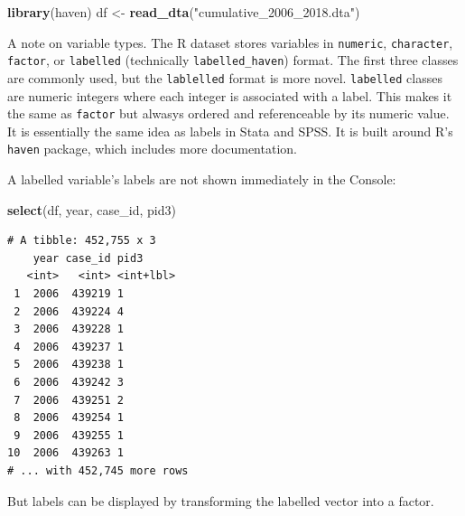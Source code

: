 \documentclass[10pt,article,oneside]{memoir}
\theoremstyle{definition}
\newenvironment{Shaded}{\begin{snugshade}}{\end{snugshade}}
\newcommand{\KeywordTok}[1]{\textcolor[rgb]{0.13,0.29,0.53}{\textbf{#1}}}
\newcommand{\DataTypeTok}[1]{\textcolor[rgb]{0.13,0.29,0.53}{#1}}
\newcommand{\StringTok}[1]{\textcolor[rgb]{0.31,0.60,0.02}{#1}}
\newcommand{\OperatorTok}[1]{\textcolor[rgb]{0.81,0.36,0.00}{\textbf{#1}}}
\newcommand{\NormalTok}[1]{#1}
\begin{document}
\begin{Shaded}
\begin{Highlighting}[]
\KeywordTok{library}\NormalTok{(haven)}
\NormalTok{df <-}\StringTok{ }\KeywordTok{read_dta}\NormalTok{(}\StringTok{"cumulative_2006_2018.dta"}\NormalTok{)}
\end{Highlighting}
\end{Shaded}

A note on variable types. The R dataset stores variables in
\texttt{numeric}, \texttt{character}, \texttt{factor}, or
\texttt{labelled} (technically \texttt{labelled\_haven}) format. The
first three classes are commonly used, but the \texttt{lablelled} format
is more novel. \texttt{labelled} classes are numeric integers where each
integer is associated with a label. This makes it the same as
\texttt{factor} but alwasys ordered and referenceable by its numeric
value. It is essentially the same idea as labels in Stata and SPSS. It
is built around R's \texttt{haven} package, which includes more
documentation.

A labelled variable's labels are not shown immediately in the Console:

\begin{Shaded}
\begin{Highlighting}[]
\KeywordTok{select}\NormalTok{(df, year, case_id, pid3)}
\end{Highlighting}
\end{Shaded}

\begin{verbatim}
# A tibble: 452,755 x 3
    year case_id pid3     
   <int>   <int> <int+lbl>
 1  2006  439219 1        
 2  2006  439224 4        
 3  2006  439228 1        
 4  2006  439237 1        
 5  2006  439238 1        
 6  2006  439242 3        
 7  2006  439251 2        
 8  2006  439254 1        
 9  2006  439255 1        
10  2006  439263 1        
# ... with 452,745 more rows
\end{verbatim}

But labels can be displayed by transforming the labelled vector into a
factor.

\begin{Shaded}
\end{Shaded}
\end{document}
